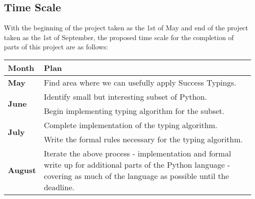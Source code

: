 \documentclass[12pt, titlepage]{article}
\begin{document}
\subsection*{Time Scale}
With the beginning of the project taken as the 1st of May and end of the project taken as the 1st of September, the proposed time scale for the completion of parts of this project are as follows:
\begin{center}
    \begin{tabular}{| l | p{12cm} |}
    \hline
    \textbf{Month} & \textbf{Plan} \\ \hline
    \textbf{May} & Find area where we can usefully apply Success Typings. \\ \hline
    \multirow{2}{*}{\textbf{June}} & Identify small but interesting subset of Python. \\
    					              & Begin implementing typing algorithm for the subset. \\ \hline
    \multirow{2}{*}{\textbf{July}} & Complete implementation of the typing algorithm. \\
    					              & Write the formal rules necessary for the typing algorithm. \\ \hline
    \textbf{August} & Iterate the above process - implementation and formal write up for additional parts of the Python language - covering as much of the language as possible until the deadline. \\
    \hline
    \end{tabular}
\end{center}

{}

\end{document}
